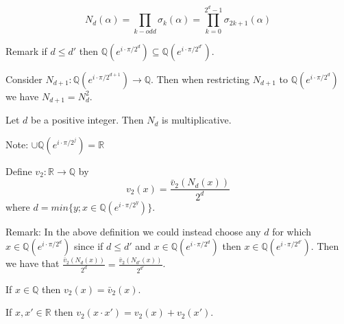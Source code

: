 \documentclass[12pt]{dalthesis}
\begin{document}
\begin{equation}
N_d(\alpha) = \prod_{k-odd} \sigma_k (\alpha) = \prod_{k=0}^{2^d - 1} \sigma_{2k+1} (\alpha)
\end{equation}

Remark if $d \leq d'$ then $\mathbb{Q}(e^{i\cdot \pi / 2^d}) \subseteq \mathbb{Q}(e^{i\cdot \pi / 2^{d'}})$.

\begin{proposition}
Consider $N_{d+1}: \mathbb{Q}(e^{i\cdot \pi / 2^{d+1}}) \longrightarrow \mathbb{Q}$. Then when restricting $N_{d+1}$ to $\mathbb{Q}(e^{i\cdot \pi / 2^{d}})$ we have $N_{d+1} = N_d^2$.
\end{proposition}

\begin{proposition}
Let $d$ be a positive integer. Then $N_d$ is multiplicative.
\end{proposition}

Note: $\cup \mathbb{Q}(e^{i\cdot \pi / 2^{j}}) = \mathbb{R}$
\begin{definition}
Define $v_2: \mathbb{R} \longrightarrow \mathbb{Q}$ by 
\begin{equation}
v_2 (x) = \frac{\bar{v}_2 (N_d (x))}{2^d}
\end{equation}
where $d = min\{ y; x \in \mathbb{Q} (e^{i \cdot \pi / 2^y })\}$.
\end{definition}

Remark: In the above definition we could instead choose any $d$ for which $x \in \mathbb{Q} (e^{i \cdot \pi / 2^d})$ since if $d \leq d'$ and $x \in \mathbb{Q} (e^{i \cdot \pi / 2^d})$ then $x \in \mathbb{Q} (e^{i \cdot \pi / 2^{d'}})$.
Then we have that $\frac{\bar{v}_2 (N_d (x))}{2^d} = \frac{\bar{v}_2 (N_{d'} (x))}{2^{d'}}$.

\begin{proposition}
If $x \in \mathbb{Q}$ then $v_2 (x) = \bar{v}_2 (x)$.
\end{proposition}

\begin{proposition}
If $x, x' \in \mathbb{R}$ then $v_2 (x \cdot x') = v_2 (x) + v_2 (x')$.
\end{proposition}
\end{document}
